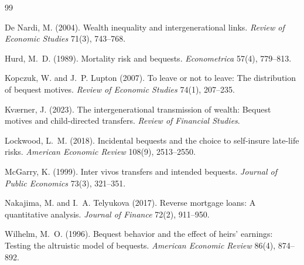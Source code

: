 \documentclass[10pt]{article}
\begin{document}
\begingroup
\small
\begin{thebibliography}{99}

De Nardi, M. (2004).
Wealth inequality and intergenerational links.
\emph{Review of Economic Studies} 71(3), 743--768.

Hurd, M.~D. (1989).
Mortality risk and bequests.
\emph{Econometrica} 57(4), 779--813.

Kopczuk, W. and J.~P. Lupton (2007).
To leave or not to leave: The distribution of bequest motives.
\emph{Review of Economic Studies} 74(1), 207--235.

Kv\ae rner, J. (2023).
The intergenerational transmission of wealth: Bequest motives and
child-directed transfers.
\emph{Review of Financial Studies}.

Lockwood, L.~M. (2018).
Incidental bequests and the choice to self-insure late-life risks.
\emph{American Economic Review} 108(9), 2513--2550.

McGarry, K. (1999).
Inter vivos transfers and intended bequests.
\emph{Journal of Public Economics} 73(3), 321--351.

Nakajima, M. and I.~A. Telyukova (2017).
Reverse mortgage loans: A quantitative analysis.
\emph{Journal of Finance} 72(2), 911--950.

Wilhelm, M.~O. (1996).
Bequest behavior and the effect of heirs' earnings: Testing the altruistic
model of bequests.
\emph{American Economic Review} 86(4), 874--892.

\end{thebibliography}
\endgroup
\end{document}
